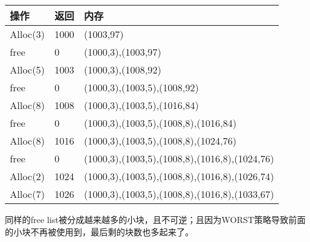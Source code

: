 \documentclass[11pt]{article}
\begin{document}
\begin{tabular}{p{2cm}p{2cm}p{11cm}}  %
    \toprule[2pt]
    操作 & 返回 & 内存 \\ %
    \midrule[2pt]
    Alloc(3)    & 1000      & (1003,97)      \\
    free        & 0 & (1000,3),(1003,97) \\
    Alloc(5)    & 1003 & (1000,3),(1008,92) \\
    free        & 0 & (1000,3),(1003,5),(1008,92) \\
    Alloc(8)    & 1008 & (1000,3),(1003,5),(1016,84) \\
    free        & 0 & (1000,3),(1003,5),(1008,8),(1016,84) \\
    Alloc(8)    & 1016 & (1000,3),(1003,5),(1008,8),(1024,76)\\
    free        & 0 & (1000,3),(1003,5),(1008,8),(1016,8),(1024,76) \\
    Alloc(2)    & 1024 & (1000,3),(1003,5),(1008,8),(1016,8),(1026,74) \\
    Alloc(7)    & 1026 & (1000,3),(1003,5),(1008,8),(1016,8),(1033,67)  \\
    \bottomrule[2pt]
\end{tabular}
\hspace*{2em}同样的free list被分成越来越多的小块，且不可逆；且因为WORST策略导致前面的小块不再被使用到，最后剩的块数也多起来了。\\
\end{document}
